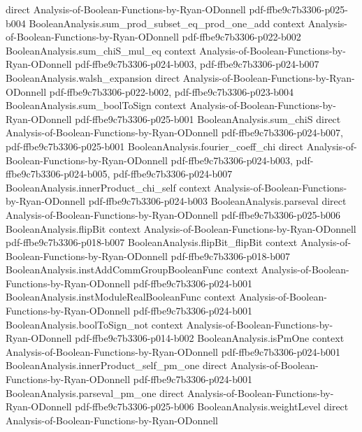 \begin{lemma}
  {direct}
  {Analysis-of-Boolean-Functions-by-Ryan-ODonnell}
  {pdf-ffbe9c7b3306-p025-b004}
\proofstep
  {BooleanAnalysis.sum_prod_subset_eq_prod_one_add}
  {context}
  {Analysis-of-Boolean-Functions-by-Ryan-ODonnell}
  {pdf-ffbe9c7b3306-p022-b002}
\proofstep
  {BooleanAnalysis.sum_chiS_mul_eq}
  {context}
  {Analysis-of-Boolean-Functions-by-Ryan-ODonnell}
  {pdf-ffbe9c7b3306-p024-b003,
    pdf-ffbe9c7b3306-p024-b007}
\proofstep
  {BooleanAnalysis.walsh_expansion}
  {direct}
  {Analysis-of-Boolean-Functions-by-Ryan-ODonnell}
  {pdf-ffbe9c7b3306-p022-b002,
    pdf-ffbe9c7b3306-p023-b004}
\proofstep
  {BooleanAnalysis.sum_boolToSign}
  {context}
  {Analysis-of-Boolean-Functions-by-Ryan-ODonnell}
  {pdf-ffbe9c7b3306-p025-b001}
\proofstep
  {BooleanAnalysis.sum_chiS}
  {direct}
  {Analysis-of-Boolean-Functions-by-Ryan-ODonnell}
  {pdf-ffbe9c7b3306-p024-b007,
    pdf-ffbe9c7b3306-p025-b001}
\proofstep
  {BooleanAnalysis.fourier_coeff_chi}
  {direct}
  {Analysis-of-Boolean-Functions-by-Ryan-ODonnell}
  {pdf-ffbe9c7b3306-p024-b003,
    pdf-ffbe9c7b3306-p024-b005,
    pdf-ffbe9c7b3306-p024-b007}
\proofstep
  {BooleanAnalysis.innerProduct_chi_self}
  {context}
  {Analysis-of-Boolean-Functions-by-Ryan-ODonnell}
  {pdf-ffbe9c7b3306-p024-b003}
\proofstep
  {BooleanAnalysis.parseval}
  {direct}
  {Analysis-of-Boolean-Functions-by-Ryan-ODonnell}
  {pdf-ffbe9c7b3306-p025-b006}
\proofstep
  {BooleanAnalysis.flipBit}
  {context}
  {Analysis-of-Boolean-Functions-by-Ryan-ODonnell}
  {pdf-ffbe9c7b3306-p018-b007}
\proofstep
  {BooleanAnalysis.flipBit_flipBit}
  {context}
  {Analysis-of-Boolean-Functions-by-Ryan-ODonnell}
  {pdf-ffbe9c7b3306-p018-b007}
\proofstep
  {BooleanAnalysis.instAddCommGroupBooleanFunc}
  {context}
  {Analysis-of-Boolean-Functions-by-Ryan-ODonnell}
  {pdf-ffbe9c7b3306-p024-b001}
\proofstep
  {BooleanAnalysis.instModuleRealBooleanFunc}
  {context}
  {Analysis-of-Boolean-Functions-by-Ryan-ODonnell}
  {pdf-ffbe9c7b3306-p024-b001}
\proofstep
  {BooleanAnalysis.boolToSign_not}
  {context}
  {Analysis-of-Boolean-Functions-by-Ryan-ODonnell}
  {pdf-ffbe9c7b3306-p014-b002}
\proofstep
  {BooleanAnalysis.isPmOne}
  {context}
  {Analysis-of-Boolean-Functions-by-Ryan-ODonnell}
  {pdf-ffbe9c7b3306-p024-b001}
\proofstep
  {BooleanAnalysis.innerProduct_self_pm_one}
  {direct}
  {Analysis-of-Boolean-Functions-by-Ryan-ODonnell}
  {pdf-ffbe9c7b3306-p024-b001}
\proofstep
  {BooleanAnalysis.parseval_pm_one}
  {direct}
  {Analysis-of-Boolean-Functions-by-Ryan-ODonnell}
  {pdf-ffbe9c7b3306-p025-b006}
\proofstep
  {BooleanAnalysis.weightLevel}
  {direct}
  {Analysis-of-Boolean-Functions-by-Ryan-ODonnell}

\end{lemma}
